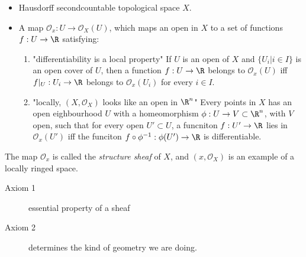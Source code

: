 \begin{definition}
	\begin{itemize}
		\item Hausdorff secondcountable topological space $X$. 
		\item A map $\mathcal{O} _x: U \to \mathcal{O}_X(U)$, which maps an open in $X$ to a set of functions $f: U \to \R$ satisfying:
			\begin{enumerate}
				\item "differentiability is a local property"
					If $U$ is an open of $X$ and $\{U_i | i \in I\} $ is an open cover of $U$, then a function $f: U \to \R$ belongs to $\mathcal{O} _x(U)$ iff $f|_U:U_i \to \R$ belongs to $\mathcal{O} _x(U_i)$ for every $i \in I$.
				\item "locally,  $(X, \mathcal{O} _X)$ looks like an open in $\R^{n}$" 
					Every points in $X$ has an open eighbourhood $U$ with a homeomorphism $\phi: U \to V \subset \R^{n}$, with $V$ open, such that for every open $U'\subset U$, a funcniton $f: U' \to \R$ lies in $\mathcal{O} _x(U')$ iff the funciton $f \circ \phi^{-1}: \phi(U') \to \R$ is differentiable. 
			\end{enumerate}
	\end{itemize}
\end{definition}
The map $\mathcal{O} _x$ is called the \emph{structure sheaf} of $X$, and $(x, \mathcal{O} _X)$ is an example of a locally ringed space.


\begin{description}
	\item[Axiom 1] essential property of a sheaf
	\item[Axiom 2] determines the kind of geometry we are doing. 
\end{description}
